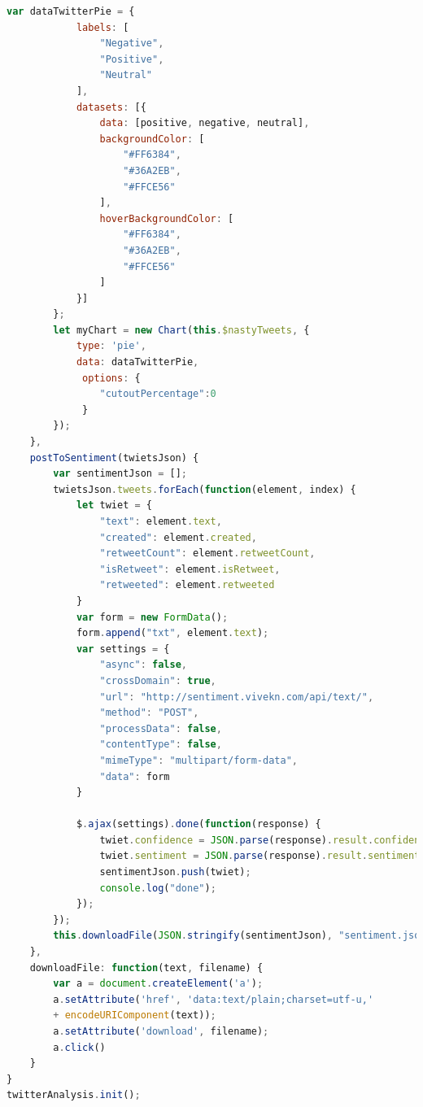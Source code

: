\begin{lstlisting}[language=JavaScript]
        var dataTwitterPie = {
            labels: [
                "Negative",
                "Positive",
                "Neutral"
            ],
            datasets: [{
                data: [positive, negative, neutral],
                backgroundColor: [
                    "#FF6384",
                    "#36A2EB",
                    "#FFCE56"
                ],
                hoverBackgroundColor: [
                    "#FF6384",
                    "#36A2EB",
                    "#FFCE56"
                ]
            }]
        };
        let myChart = new Chart(this.$nastyTweets, {
            type: 'pie',
            data: dataTwitterPie,
             options: {
                "cutoutPercentage":0
             }
        });
    },
    postToSentiment(twietsJson) {
        var sentimentJson = [];
        twietsJson.tweets.forEach(function(element, index) {
            let twiet = {
                "text": element.text,
                "created": element.created,
                "retweetCount": element.retweetCount,
                "isRetweet": element.isRetweet,
                "retweeted": element.retweeted
            }
            var form = new FormData();
            form.append("txt", element.text);
            var settings = {
                "async": false,
                "crossDomain": true,
                "url": "http://sentiment.vivekn.com/api/text/",
                "method": "POST",
                "processData": false,
                "contentType": false,
                "mimeType": "multipart/form-data",
                "data": form
            }

            $.ajax(settings).done(function(response) {
                twiet.confidence = JSON.parse(response).result.confidence
                twiet.sentiment = JSON.parse(response).result.sentiment
                sentimentJson.push(twiet);
                console.log("done");
            });
        });
        this.downloadFile(JSON.stringify(sentimentJson), "sentiment.json");
    },
    downloadFile: function(text, filename) {
        var a = document.createElement('a');
        a.setAttribute('href', 'data:text/plain;charset=utf-u,'
        + encodeURIComponent(text));
        a.setAttribute('download', filename);
        a.click()
    }
}
twitterAnalysis.init();

\end{lstlisting}
